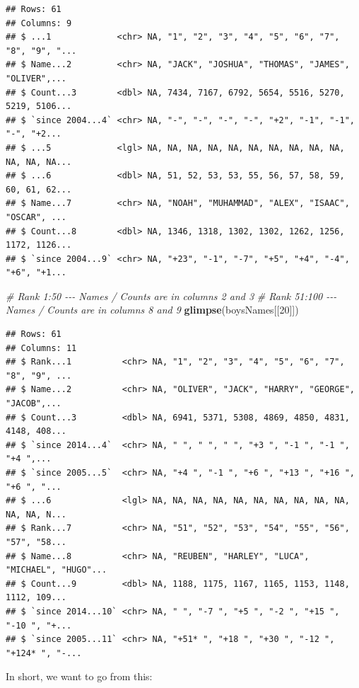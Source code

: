 \documentclass[
]{book}
\newenvironment{Shaded}{\begin{snugshade}}{\end{snugshade}}
\newcommand{\CommentTok}[1]{\textcolor[rgb]{0.56,0.35,0.01}{\textit{#1}}}
\newcommand{\DecValTok}[1]{\textcolor[rgb]{0.00,0.00,0.81}{#1}}
\newcommand{\KeywordTok}[1]{\textcolor[rgb]{0.13,0.29,0.53}{\textbf{#1}}}
\newcommand{\NormalTok}[1]{#1}
\begin{document}
\begin{verbatim}
## Rows: 61
## Columns: 9
## $ ...1             <chr> NA, "1", "2", "3", "4", "5", "6", "7", "8", "9", "...
## $ Name...2         <chr> NA, "JACK", "JOSHUA", "THOMAS", "JAMES", "OLIVER",...
## $ Count...3        <dbl> NA, 7434, 7167, 6792, 5654, 5516, 5270, 5219, 5106...
## $ `since 2004...4` <chr> NA, "-", "-", "-", "-", "+2", "-1", "-1", "-", "+2...
## $ ...5             <lgl> NA, NA, NA, NA, NA, NA, NA, NA, NA, NA, NA, NA, NA...
## $ ...6             <dbl> NA, 51, 52, 53, 53, 55, 56, 57, 58, 59, 60, 61, 62...
## $ Name...7         <chr> NA, "NOAH", "MUHAMMAD", "ALEX", "ISAAC", "OSCAR", ...
## $ Count...8        <dbl> NA, 1346, 1318, 1302, 1302, 1262, 1256, 1172, 1126...
## $ `since 2004...9` <chr> NA, "+23", "-1", "-7", "+5", "+4", "-4", "+6", "+1...
\end{verbatim}

\begin{Shaded}
\begin{Highlighting}[]
\CommentTok{\# Rank 1:50 {-}{-}{-} Names / Counts are in columns 2 and 3 }
\CommentTok{\# Rank 51:100 {-}{-}{-} Names / Counts are in columns 8 and 9}
\KeywordTok{glimpse}\NormalTok{(boysNames[[}\DecValTok{20}\NormalTok{]]) }
\end{Highlighting}
\end{Shaded}

\begin{verbatim}
## Rows: 61
## Columns: 11
## $ Rank...1          <chr> NA, "1", "2", "3", "4", "5", "6", "7", "8", "9", ...
## $ Name...2          <chr> NA, "OLIVER", "JACK", "HARRY", "GEORGE", "JACOB",...
## $ Count...3         <dbl> NA, 6941, 5371, 5308, 4869, 4850, 4831, 4148, 408...
## $ `since 2014...4`  <chr> NA, "­ ", "­ ", "­ ", "+3 ", "-1 ", "-1 ", "+4 ",...
## $ `since 2005...5`  <chr> NA, "+4 ", "-1 ", "+6 ", "+13 ", "+16 ", "+6 ", "...
## $ ...6              <lgl> NA, NA, NA, NA, NA, NA, NA, NA, NA, NA, NA, NA, N...
## $ Rank...7          <chr> NA, "51", "52", "53", "54", "55", "56", "57", "58...
## $ Name...8          <chr> NA, "REUBEN", "HARLEY", "LUCA", "MICHAEL", "HUGO"...
## $ Count...9         <dbl> NA, 1188, 1175, 1167, 1165, 1153, 1148, 1112, 109...
## $ `since 2014...10` <chr> NA, "­ ", "-7 ", "+5 ", "-2 ", "+15 ", "-10 ", "+...
## $ `since 2005...11` <chr> NA, "+51* ", "+18 ", "+30 ", "-12 ", "+124* ", "-...
\end{verbatim}

In short, we want to go from this:
\end{document}
